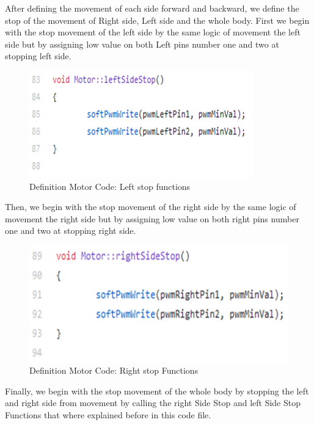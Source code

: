 \newpage

 After defining the movement of each side forward and backward, we define the stop of the movement of Right side, Left side and the whole body. First we begin with the stop movement of the left side by the same logic of movement the left side but by assigning low value on both Left pins number one and two at stopping left side.

\begin{figure}[h]
    \centering
    \includegraphics{figures/65.png}
    \caption{Definition Motor Code: Left stop functions}
    \label{fig:my_label}
\end{figure}


Then, we begin with the stop movement of the right side by the same logic of movement the right side but by assigning low value on both right pins number one and two at stopping right side.

\begin{figure}[h]
    \centering
    \includegraphics{figures/66.png}
    \caption{Definition Motor Code: Right stop Functions}
    \label{fig:my_label}
\end{figure}

\newpage

Finally, we begin with the stop movement of the whole body by stopping the left and right side from movement by calling the right Side Stop and left Side Stop Functions that where explained before in this code file.

